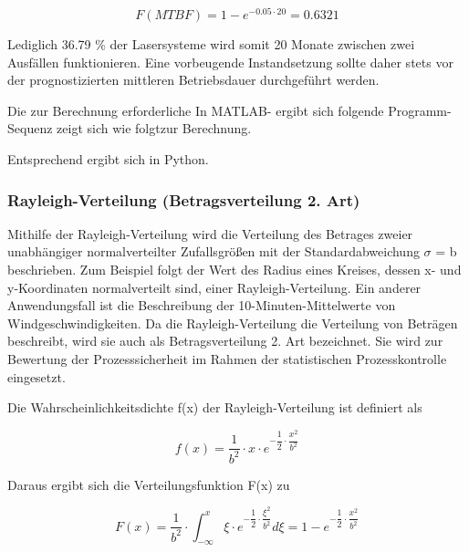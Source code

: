 \begin{equation}\label{eq:fourtwohundred}
F(MTBF)=1-e^{-0.05\cdot 20} =0.6321
\end{equation}

\noindent Lediglich 36.79 \% der Lasersysteme wird somit 20 Monate zwischen zwei Ausf\"{a}llen funktionieren. Eine vorbeugende Instandsetzung sollte daher stets vor der prognostizierten mittleren Betriebsdauer durchgef\"{u}hrt werden.\newline

\noindent Die zur Berechnung erforderliche In MATLAB- ergibt sich folgende Programm-Sequenz zeigt sich wie folgtzur Berechnung.



\noindent Entsprechend ergibt sich in Python.



\subsubsection{Rayleigh-Verteilung (Betragsverteilung 2. Art)}

\noindent Mithilfe der Rayleigh-Verteilung wird die Verteilung des Betrages zweier unabh\"{a}ngiger normalverteilter Zufallsgr\"{o}{\ss}en mit der Standardabweichung $\sigma$ = b beschrieben. Zum Beispiel folgt der Wert des Radius eines Kreises, dessen x- und y-Koordinaten normalverteilt sind, einer Rayleigh-Verteilung. Ein anderer Anwendungsfall ist die Beschreibung der 10-Minuten-Mittelwerte von Windgeschwindigkeiten. Da die Rayleigh-Verteilung die Verteilung von Betr\"{a}gen beschreibt, wird sie auch als Betragsverteilung 2. Art bezeichnet. Sie wird zur Bewertung der Prozesssicherheit im Rahmen der statistischen Prozesskontrolle eingesetzt.

\clearpage 

\noindent Die Wahrscheinlichkeitsdichte f(x) der Rayleigh-Verteilung ist definiert als

\begin{equation}\label{eq:fourtwohundredone}
f(x)=\dfrac{1}{b^{2}} \cdot x\cdot e^{-\dfrac{1}{2} \cdot \dfrac{x^{2}}{b^{2}}}
\end{equation}

\noindent Daraus ergibt sich die Verteilungsfunktion F(x) zu

\begin{equation}\label{eq:fourtwohundredtwo}
F(x)=\dfrac{1}{b^{2} } \cdot \int _{-\infty }^{x}\xi \cdot e^{-\dfrac{1}{2} \cdot \dfrac{\xi ^{2} }{b^{2}}} d\xi  =1-e^{-\dfrac{1}{2} \cdot \dfrac{x^{2} }{b^{2}}}
\end{equation}

